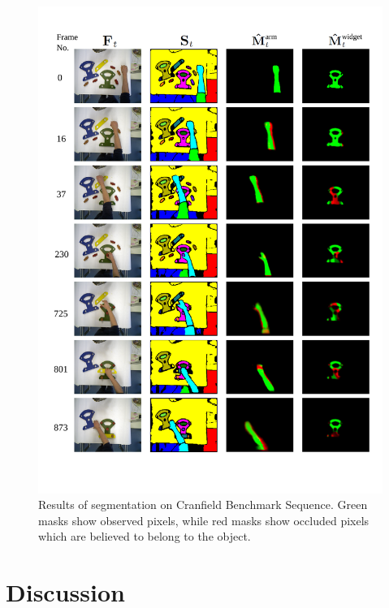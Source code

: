 \begin{figure}[t]
\includegraphics[width=\linewidth]{figures/ECCV2012/Cranfield_Results.pdf}
  \caption[Results of Cranfield Sequence]{Results of segmentation on Cranfield Benchmark Sequence. Green masks show observed pixels, while red masks show occluded pixels which are believed to belong to the object.}
\label{fig:Cranfield_Results}
\end{figure}

\section{Discussion}

